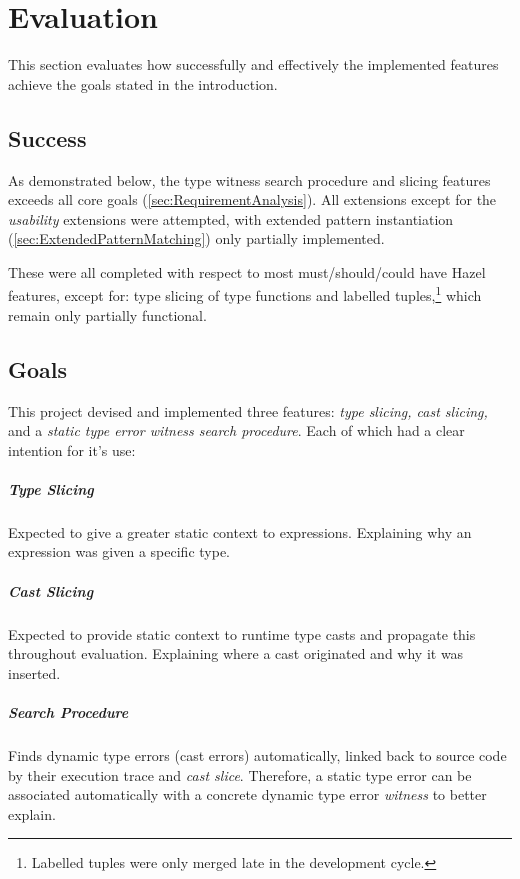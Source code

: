 \chapter{Evaluation}\label{chap:Evaluation}
This section evaluates how successfully and effectively the implemented features achieve the goals stated in the introduction.

\section{Success}
As demonstrated below, the type witness search procedure and slicing features exceeds all core goals (\cref{sec:RequirementAnalysis}). All extensions except for the \textit{usability} extensions were attempted, with extended pattern instantiation (\cref{sec:ExtendedPatternMatching}) only partially implemented.

These were all completed with respect to most must/should/could have Hazel features, except for: type slicing of type functions and labelled tuples,\footnote{Labelled tuples were only merged late in the development cycle.} which remain only partially functional. 

\section{Goals}\label{sec:EvaluationGoals}
This project devised and implemented three features: \textit{type slicing, cast slicing,} and a \textit{static type error witness search procedure}. Each of which had a clear intention for it's use:

\paragraph{Type Slicing} Expected to give a greater static context to expressions. Explaining why an expression was given a specific type.

\paragraph{Cast Slicing} Expected to provide static context to runtime type casts and propagate this throughout evaluation. Explaining where a cast originated and why it was inserted.

\paragraph{Search Procedure} Finds dynamic type errors (cast errors) automatically, linked back to source code by their execution trace and \textit{cast slice}. Therefore, a static type error can be associated automatically with a concrete dynamic type error \textit{witness} to better explain.


